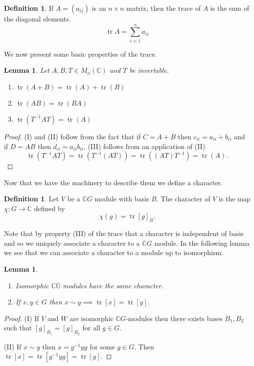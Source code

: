 \documentclass[11pt, notitlepage]{article}
\numberwithin{equation}{section}
\theoremstyle{plain}
\newtheorem{lemma}[theorem]{Lemma}
\theoremstyle{definition}
\newtheorem{definition}[theorem]{Definition}
\DeclareMathOperator{\tr}{tr}
\begin{document}
\begin{definition}
If $A = (a_{ij})$ is an $n\times n$ matrix, then the trace of $A$ is the sum of the diagonal elements.
\[
	\tr A = \sum_{i=1}^n a_{ii}
\]
\end{definition}

We now present some basic properties of the trace.

\begin{lemma}
Let $A,B,T\in M_{n}(\mathbb{C})$ and $T$ be invertable.
\begin{enumerate}[label=\emph{(\Roman*)}]
	\item $\tr(A+B) = \tr(A) + \tr(B)$
	\item $\tr(AB) = \tr(BA)$
	\item $\tr(T^{-1}AT) = \tr(A)$
\end{enumerate}
\end{lemma}

\begin{proof}
(I) and (II) follow from the fact that if $C = A + B$ then $c_{ii} = a_{ii} + b_{ii}$ and if $D = AB$ then $d_{ii} = a_{ii}b_{ii}$. (III) follows from an application of (II)
\[
	\tr(T^{-1}AT) = \tr(T^{-1}(AT)) = \tr((AT)T^{-1}) = \tr(A).
\]
\end{proof}

Now that we have the machinery to describe them we define a character.

\begin{definition}
	Let $V$ be a $\mathbb{C}G$ module with basis $B$. The character of $V$ is the map $\chi: G\to\mathbb{C}$ defined by
\[
	\chi(g) = \tr [g]_B.
\]
\end{definition}

Note that by property (III) of the trace that a character is independent of basis and so we uniquely associate a character to a $\mathbb{C}G$ module. In the following lemma we see that we can associate a character to a module up to isomorphism.

\begin{lemma} ~
\begin{enumerate}[label=\emph{(\Roman*)}]
	\item Isomorphic $\mathbb{CG}$ modules have the same character.
	\item If $x,y\in G$ then $x\sim y \implies \tr[x] = \tr[y]$.
\end{enumerate}
\end{lemma}


\begin{proof}
(I) If $V$ and $W$ are isomorphic $\mathbb{C}G$-modules then there exists bases $B_1, B_2$ such that $[g]_{B_1} = [g]_{B_2}$ for all $g\in G$.

	(II) If $x\sim y$ then $x = g^{-1}yg$ for some $g\in G$. Then $\tr[x] = \tr[g^{-1}yg] = \tr[y]$.
\end{proof}
\end{document}
